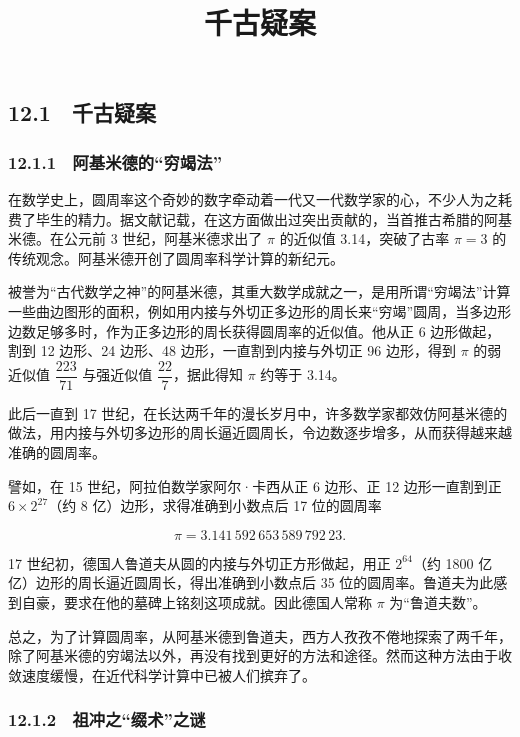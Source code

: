 \documentclass[
  10pt,
  fontset=fandol]{ctexart}
\title{千古疑案}
\author{}
\date{}
\begin{document}
\maketitle

\subsection{12.1　千古疑案}\label{ux5343ux53e4ux7591ux6848}

\subsubsection{12.1.1　阿基米德的``穷竭法''}\label{ux963fux57faux7c73ux5fb7ux7684ux7a77ux7aedux6cd5}

在数学史上，圆周率这个奇妙的数字牵动着一代又一代数学家的心，不少人为之耗费了毕生的精力。据文献记载，在这方面做出过突出贡献的，当首推古希腊的阿基米德。在公元前 3 世纪，阿基米德求出了 \(\pi\) 的近似值 3.14，突破了古率 \(\pi=3\) 的传统观念。阿基米德开创了圆周率科学计算的新纪元。

被誉为``古代数学之神''的阿基米德，其重大数学成就之一，是用所谓``穷竭法''计算一些曲边图形的面积，例如用内接与外切正多边形的周长来``穷竭''圆周，当多边形边数足够多时，作为正多边形的周长获得圆周率的近似值。他从正 6 边形做起，割到 12 边形、24 边形、48 边形，一直割到内接与外切正 96 边形，得到 \(\pi\) 的弱近似值 \(\dfrac{223}{71}\) 与强近似值 \(\dfrac{22}{7}\)，据此得知 \(\pi\) 约等于 3.14。

此后一直到 17 世纪，在长达两千年的漫长岁月中，许多数学家都效仿阿基米德的做法，用内接与外切多边形的周长逼近圆周长，令边数逐步增多，从而获得越来越准确的圆周率。

譬如，在 15 世纪，阿拉伯数学家阿尔·卡西从正 6 边形、正 12 边形一直割到正 \(6\times2^{27}\)（约 8 亿）边形，求得准确到小数点后 17 位的圆周率

\[
\pi=3.141\,592\,653\,589\,792\,23.
\]

17 世纪初，德国人鲁道夫从圆的内接与外切正方形做起，用正 \(2^{64}\)（约 1800 亿亿）边形的周长逼近圆周长，得出准确到小数点后 35 位的圆周率。鲁道夫为此感到自豪，要求在他的墓碑上铭刻这项成就。因此德国人常称 \(\pi\) 为``鲁道夫数''。

总之，为了计算圆周率，从阿基米德到鲁道夫，西方人孜孜不倦地探索了两千年，除了阿基米德的穷竭法以外，再没有找到更好的方法和途径。然而这种方法由于收敛速度缓慢，在近代科学计算中已被人们摈弃了。

\subsubsection{12.1.2　祖冲之``缀术''之谜}\label{ux7956ux51b2ux4e4bux7f00ux672fux4e4bux8c1c}
\end{document}
